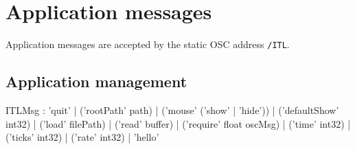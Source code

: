 \documentclass[a4paper,twoside]{report}
\newcommand{\toplevel}[1]	{\chapter{#1}}
\newcommand{\sublevel}[1]	{\section{#1}}
\newcommand{\OSC}[1]		{\texttt{#1}}
\begin{document}
\toplevel{Application messages}
\label{ITL}
Application messages are accepted by the static OSC address \OSC{/ITL}. 


\sublevel{Application management}
\label{applmgmt}

\begin{rail}
ITLMsg : 'quit' 
		| ('rootPath' path) 
		| ('mouse' ('show' | 'hide'))
		| ('defaultShow' int32)
		| ('load' filePath)
		| ('read' buffer)
		| ('require' float oscMsg)
		| ('time' int32)
		| ('ticks' int32)
		| ('rate' int32)
		| 'hello'
\end{rail}
\end{document}
